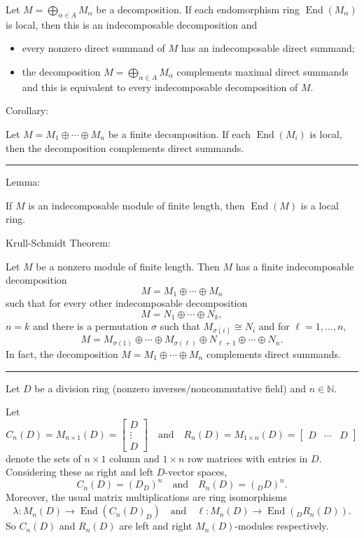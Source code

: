 \documentclass[12pt]{article}
\newcommand{\sepline}{\rule{\textwidth}{0.4pt}}
\theoremstyle{definition}
\newcommand{\isp}[1]{\quad\text{#1}\quad}
\newcommand{\N}{\mathbb{N}}
\newcommand{\<}{\left\langle}
\renewcommand{\>}{\right\rangle}
\newcommand{\iso}{\cong}
\newcommand{\To}{\longrightarrow}
\DeclareMathOperator{\End}{End}
\newcommand{\mat}[1]{\begin{bmatrix}#1\end{bmatrix}}
\renewcommand{\_}[1]{{_{#1}}}
\begin{document}
Let $M = \bigoplus_{\alpha \in A} M_\alpha$ be a decomposition.
If each endomorphism ring $\End(M_\alpha)$ is local, then this is an indecomposable decomposition and
\begin{itemize}
    \item every nonzero direct summand of $M$ has an indecomposable direct summand;
    \item the decomposition $M = \bigoplus_{\alpha \in A} M_\alpha$ complements maximal direct summands and this is equivalent to every indecomposable decomposition of $M$.
\end{itemize} 

Corollary:

Let $M = M_1 \oplus \cdots \oplus M_n$ be a finite decomposition.
If each $\End(M_i)$ is local, then the decomposition complements direct summands.

\sepline

Lemma:

If $M$ is an indecomposable module of finite length, then $\End(M)$ is a local ring.

Krull-Schmidt Theorem:

Let $M$ be a nonzero module of finite length.
Then $M$ has a finite indecomposable decomposition
\[
    M = M_1 \oplus \cdots \oplus M_n
\]
such that for every other indecomposable decomposition
\[
    M = N_1 \oplus \cdots \oplus N_k,
\]
$n = k$ and there is a permutation $\sigma$ such that $M_{\sigma(i)} \iso N_i$ and for $\ell = 1, \dots, n$,
\[
    M = M_{\sigma(1)} \oplus \cdots \oplus M_{\sigma(\ell)} \oplus N_{\ell + 1} \oplus \cdots \oplus N_n.
\]
In fact, the decomposition $M = M_1 \oplus \cdots \oplus M_n$ complements direct summands.

\sepline

Let $D$ be a division ring (nonzero inverses/noncommutative field) and $n \in \N$.

Let
\[
    C_n(D) = M_{n \times 1}(D) = \mat{D \\ \vdots \\ D}
    \isp{and}
    R_n(D) = M_{1 \times n}(D) = \mat{D & \cdots & D} 
\]
denote the sets of $n \times 1$ column and $1 \times n$ row matrices with entries in $D$.
Considering these as right and left $D$-vector spaces,
\[
    C_n(D) = (D_D)^n \isp{and} R_n(D) = (\_DD)^n.
\] 
Moreover, the usual matrix multiplications are ring isomorphisms
\[
    \lambda : M_n(D) \To \End(C_n(D)_D) \isp{and} \ell : M_n(D) \To \End(\_DR_n(D)).
\]
So $C_n(D)$ and $R_n(D)$ are left and right $M_n(D)$-modules respectively.
\end{document}
